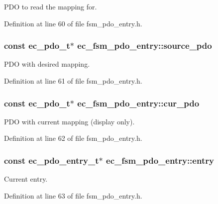 P\-D\-O to read the mapping for. 



Definition at line 60 of file fsm\-\_\-pdo\-\_\-entry.\-h.

\subsubsection[{source\-\_\-pdo}]{\setlength{\rightskip}{0pt plus 5cm}const {\bf ec\-\_\-pdo\-\_\-t}$\ast$ ec\-\_\-fsm\-\_\-pdo\-\_\-entry\-::source\-\_\-pdo}\label{structec__fsm__pdo__entry_a849f98cf92c6e7b30cfae04015f57ddf}


P\-D\-O with desired mapping. 



Definition at line 61 of file fsm\-\_\-pdo\-\_\-entry.\-h.

\subsubsection[{cur\-\_\-pdo}]{\setlength{\rightskip}{0pt plus 5cm}const {\bf ec\-\_\-pdo\-\_\-t}$\ast$ ec\-\_\-fsm\-\_\-pdo\-\_\-entry\-::cur\-\_\-pdo}\label{structec__fsm__pdo__entry_ab0ff663f6628eb176343945947d5c7bc}


P\-D\-O with current mapping (display only). 



Definition at line 62 of file fsm\-\_\-pdo\-\_\-entry.\-h.

\subsubsection[{entry}]{\setlength{\rightskip}{0pt plus 5cm}const {\bf ec\-\_\-pdo\-\_\-entry\-\_\-t}$\ast$ ec\-\_\-fsm\-\_\-pdo\-\_\-entry\-::entry}\label{structec__fsm__pdo__entry_a598d8f29602695173c6fe6f4e774cea8}


Current entry. 



Definition at line 63 of file fsm\-\_\-pdo\-\_\-entry.\-h.

